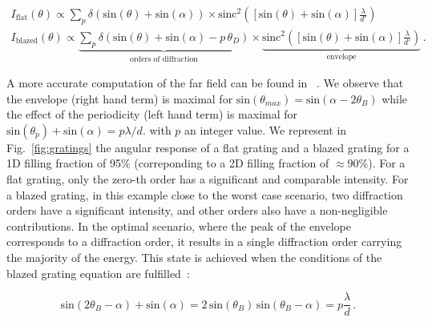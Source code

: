 \documentclass[12pt]{iopart}
\begin{document}
\begin{optional}
  \begin{equation}
    \begin{aligned}
      I_\text{flat}(\theta) \propto
      \sum_p \delta(\text{sin}(\theta)+\text{sin}(\alpha))
      \times
      \text{sinc}^2\left( \left[\text{sin}(\theta)+\text{sin}(\alpha)\right] \frac{\lambda}{d'}\right) \\
      I_\text{blazed}(\theta) \propto
      \underbrace{
        \sum_p \delta(\text{sin}(\theta)+\text{sin}(\alpha)-p\,\theta_D)
      }_\text{orders of diffraction}
      \times
      \underbrace{
        \text{sinc}^2\left( \left[\text{sin}(\theta)+\text{sin}(\alpha)\right] \frac{\lambda}{d'}\right)
      }_\text{envelope} \, .
    \end{aligned}
  \end{equation}

\end{optional}
A more accurate computation of the far field can be found  in ~\cite{Wang2023diffraction}.
We observe that the envelope (right hand term) is maximal for $\text{sin}(\theta_{max}) = \text{sin}(\alpha-2\theta_B)$
while the effect of the periodicity (left hand term) is maximal for $\text{sin}(\theta_p)+ \text{sin}(\alpha) = p \lambda/d$.
with $p$ an integer value.
We represent in Fig.~\ref{fig:gratings} the angular response of a flat grating and a blazed grating
for a 1D filling fraction of 95\% (correponding to a 2D filling fraction of $\approx 90$\%).
For a flat grating, only the zero-th order has a significant and comparable intensity.
For a blazed grating, in this example close to the worst case scenario,
two diffraction orders have a significant intensity,
and other orders also have a non-negligible contributions.
In the optimal scenario, where the peak of the envelope corresponds to a diffraction order,
it results in a single diffraction order carrying the majority of the energy.
This state is achieved when the conditions of the blazed grating equation are fulfilled~\cite{Casini2014on}:



\begin{equation}
  \text{sin}(2\theta_B-\alpha) + \text{sin}(\alpha)
  = 2 \,\text{sin}(\theta_B)  \,\text{sin}(\theta_B-\alpha)
  = p\frac{\lambda}{d} \, .
  \label{eq:blazed_eq}
\end{equation}

\end{document}
